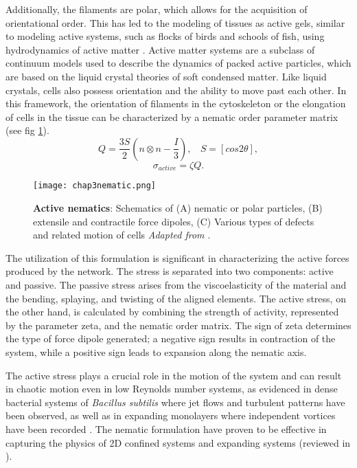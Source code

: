 Additionally, the filaments are polar, which allows for the acquisition of orientational order. This has led to the modeling of tissues as active gels, similar to modeling active systems, such as flocks of birds and schools of fish, using hydrodynamics of active matter \cite{julicher2018}. Active matter systems are a subclass of continuum models used to describe the dynamics of packed active particles, which are based on the liquid crystal theories of soft condensed matter. Like liquid crystals, cells also possess orientation and the ability to move past each other. In this framework, the orientation of filaments in the cytoskeleton or the elongation of cells in the tissue can be characterized by a nematic order parameter matrix (see fig \ref{fig_3_10}).
$$Q = \frac{3S}{2}\left(n\otimes n  -       \frac{I}{3}\right),\ \ \ \ S = [cos2\theta], $$
$$ \sigma_{active} = \zeta Q.$$

\begin{figure}[t]
	\centering
	\texttt{[image: chap3nematic.png]}
	\caption{\label{fig_3_10} \textbf{Active nematics}: Schematics of (A) nematic or polar particles, (B) extensile and contractile force dipoles, (C) Various types of defects and related motion of cells \textit{Adapted from \cite{xi2018}}. 
	}
\end{figure}

The utilization of this formulation is significant in characterizing the active forces produced by the network. The stress is separated into two components: active and passive. The passive stress arises from the viscoelasticity of the material and the bending, splaying, and twisting of the aligned elements. The active stress, on the other hand, is calculated by combining the strength of activity, represented by the parameter zeta, and the nematic order matrix. The sign of zeta determines the type of force dipole generated; a negative sign results in contraction of the system, while a positive sign leads to expansion along the nematic axis.

The active stress plays a crucial role in the motion of the system and can result in chaotic motion even in low Reynolds number systems, as evidenced in dense bacterial systems of \textit{Bacillus subtilis} where jet flows and turbulent patterns have been observed, as well as in expanding monolayers where independent vortices have been recorded \cite{wensink2012, blanch-mercader2018}. The nematic formulation have proven to be effective in capturing the physics of 2D confined systems and expanding systems (reviewed in \cite{saw2018}).

